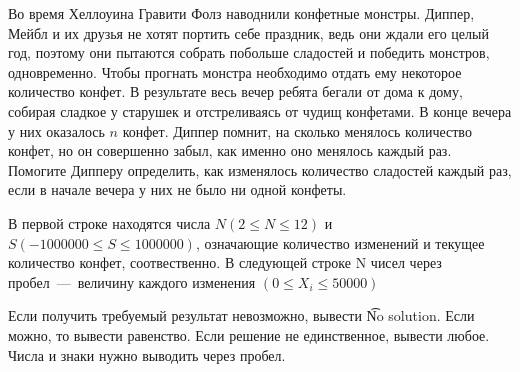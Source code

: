 

Во время Хеллоуина Гравити Фолз наводнили конфетные монстры. Диппер, Мейбл и их друзья не хотят портить себе праздник, ведь они ждали его целый год, поэтому они пытаются собрать побольше сладостей и победить монстров, одновременно. Чтобы прогнать монстра необходимо отдать ему некоторое количество конфет. В результате весь вечер ребята бегали от дома к дому, собирая сладкое у старушек и отстреливаясь от чудищ конфетами. В конце вечера у них оказалось $n$ конфет. Диппер помнит, на сколько менялось количество конфет, но он совершенно забыл, как именно оно менялось каждый раз. Помогите Дипперу определить, как изменялось количество сладостей каждый раз, если в начале вечера у них не было ни одной конфеты.

\InputFile
В первой строке находятся числа $N (2 \le N \le 12)$ и $S(-1000000 \le S \le 1000000)$, означающие количество изменений и текущее количество конфет, соотвественно. В следующей строке N чисел через пробел~---~величину каждого изменения $(0 \le X_i \le 50000)$

\OutputFile
Если получить требуемый результат невозможно, вывести \t{No solution}. Если можно, то вывести равенство. Если решение не единственное, вывести любое. Числа и знаки нужно выводить через пробел.

\SAMPLES


